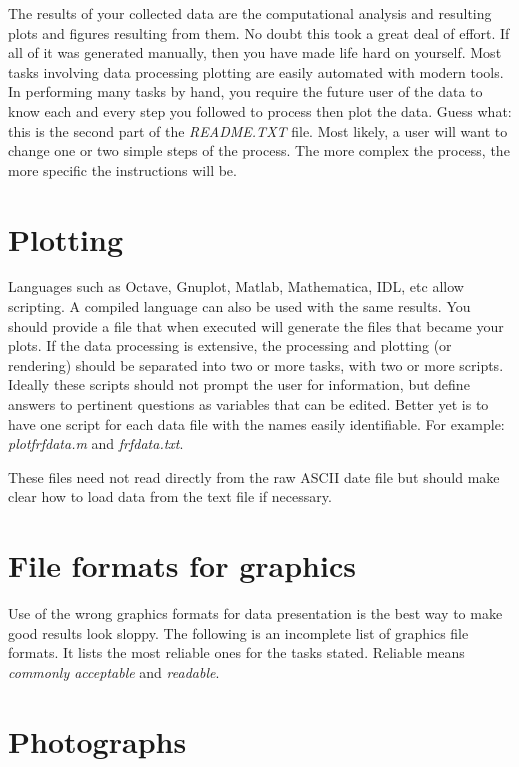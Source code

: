 \documentclass[a4paper]{article}
\begin{document}
The results of your collected data are the computational analysis and
resulting plots and figures resulting from them. No doubt this took a
great deal of effort. If all of it was generated manually, then you have
made life hard on yourself. Most tasks involving data processing
plotting are easily automated with modern tools. In performing many
tasks by hand, you require the future user of the data to know each and
every step you followed to process then plot the data. Guess what: this
is the second part of the \emph{README.TXT} file. Most likely, a user will want
to change one or two simple steps of the process. The more complex the
process, the more specific the instructions will be.


\section{Plotting%
  \label{plotting}%
}

Languages such as Octave, Gnuplot, Matlab, Mathematica, IDL, etc allow
scripting. A compiled language can also be used with the same results.
You should provide a file that when executed will generate the files
that became your plots. If the data processing is extensive, the
processing and plotting (or rendering) should be separated into two or
more tasks, with two or more scripts. Ideally these scripts should not
prompt the user for information, but define answers to pertinent
questions as variables that can be edited. Better yet is to have one
script for each data file with the names easily identifiable. For
example: \emph{plotfrfdata.m} and \emph{frfdata.txt}.

These files need not read directly from the raw ASCII date file but should make
clear how to load data from the text file if necessary.


\section{File formats for graphics%
  \label{file-formats-for-graphics}%
}

Use of the wrong graphics formats for data presentation is the best way
to make good results look sloppy. The following is an incomplete list of
graphics file formats. It lists the most reliable ones for the tasks
stated. Reliable means \emph{commonly acceptable} and \emph{readable}.


\section{Photographs%
  \label{photographs}%
}
\end{document}
